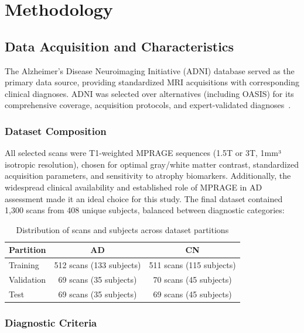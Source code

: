 \documentclass[12pt, a4paper]{article}
\begin{document}
\section{Methodology}

\subsection{Data Acquisition and Characteristics}

The Alzheimer's Disease Neuroimaging Initiative (ADNI) database served as the primary data source, providing standardized MRI acquisitions with corresponding clinical diagnoses. ADNI was selected over alternatives (including OASIS) for its comprehensive coverage, acquisition protocols, and expert-validated diagnoses~\cite{jack2008alzheimer, lamontagne2019oasis}.

\subsubsection{Dataset Composition}

All selected scans were T1-weighted MPRAGE sequences (1.5T or 3T, 1mm³ isotropic resolution), chosen for optimal gray/white matter contrast, standardized acquisition parameters, and sensitivity to atrophy biomarkers. Additionally, the widespread clinical availability and established role of MPRAGE in AD assessment made it an ideal choice for this study. The final dataset contained 1,300 scans from 408 unique subjects, balanced between diagnostic categories:

\begin{table}[htbp]
\centering
\begin{tabular}{|l|c|c|}
\hline
\textbf{Partition} & \textbf{AD} & \textbf{CN} \\
\hline
Training & 512 scans (133 subjects) & 511 scans (115 subjects) \\
Validation & 69 scans (35 subjects) & 70 scans (45 subjects) \\
Test & 69 scans (35 subjects) & 69 scans (45 subjects) \\
\hline
\end{tabular}
\caption{Distribution of scans and subjects across dataset partitions}
\end{table}

\subsubsection{Diagnostic Criteria}
\end{document}
